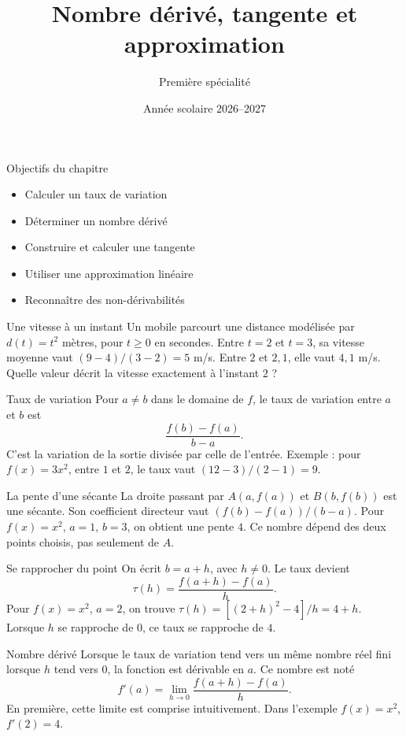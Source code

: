 \documentclass[aspectratio=169,12pt]{beamer}
\title{Nombre dérivé, tangente et approximation}
\subtitle{Première spécialité}
\date{Année scolaire 2026--2027}
\begin{document}
\begin{frame}\titlepage\end{frame}
\begin{frame}{Objectifs du chapitre}\begin{itemize}
\item Calculer un taux de variation
\item Déterminer un nombre dérivé
\item Construire et calculer une tangente
\item Utiliser une approximation linéaire
\item Reconnaître des non-dérivabilités
\end{itemize}\end{frame}
\renewcommand{\slidekind}{COMPRENDRE}
\begin{frame}[t,fragile]{Une vitesse à un instant}
Un mobile parcourt une distance modélisée par $d(t)=t^2$ mètres, pour $t\ge0$ en secondes. Entre $t=2$ et $t=3$, sa vitesse moyenne vaut $(9-4)/(3-2)=5$ m/s. Entre $2$ et $2,1$, elle vaut $4,1$ m/s. Quelle valeur décrit la vitesse exactement à l’instant $2$ ?
\end{frame}
\renewcommand{\slidekind}{COMPRENDRE}
\begin{frame}[t,fragile]{Taux de variation}
Pour $a\ne b$ dans le domaine de $f$, le taux de variation entre $a$ et $b$ est \[\frac{f(b)-f(a)}{b-a}.\] C’est la variation de la sortie divisée par celle de l’entrée. Exemple : pour $f(x)=3x^2$, entre $1$ et $2$, le taux vaut $(12-3)/(2-1)=9$.
\end{frame}
\renewcommand{\slidekind}{COMPRENDRE}
\begin{frame}[t,fragile]{La pente d’une sécante}
La droite passant par $A(a,f(a))$ et $B(b,f(b))$ est une sécante. Son coefficient directeur vaut $(f(b)-f(a))/(b-a)$. Pour $f(x)=x^2$, $a=1$, $b=3$, on obtient une pente $4$. Ce nombre dépend des deux points choisis, pas seulement de $A$.
\end{frame}
\renewcommand{\slidekind}{COMPRENDRE}
\begin{frame}[t,fragile]{Se rapprocher du point}
On écrit $b=a+h$, avec $h\ne0$. Le taux devient \[\tau(h)=\frac{f(a+h)-f(a)}h.\] Pour $f(x)=x^2$, $a=2$, on trouve $\tau(h)=[(2+h)^2-4]/h=4+h$. Lorsque $h$ se rapproche de $0$, ce taux se rapproche de $4$.
\end{frame}
\renewcommand{\slidekind}{COMPRENDRE}
\begin{frame}[t,fragile]{Nombre dérivé}
Lorsque le taux de variation tend vers un même nombre réel fini lorsque $h$ tend vers $0$, la fonction est dérivable en $a$. Ce nombre est noté \[f\prime(a)=\lim_{h\to0}\frac{f(a+h)-f(a)}h.\] En première, cette limite est comprise intuitivement. Dans l’exemple $f(x)=x^2$, $f\prime(2)=4$.
\end{frame}
\end{document}
